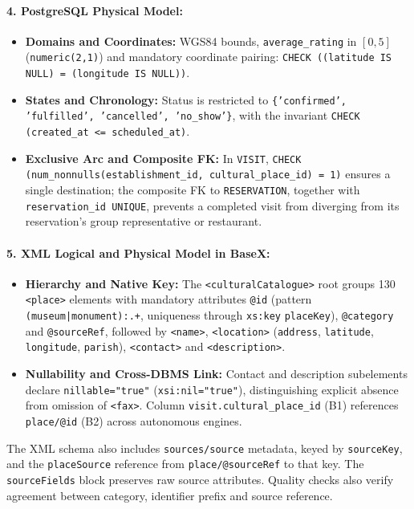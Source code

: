 \paragraph{4. PostgreSQL Physical Model:}
\begin{itemize}\raggedright
\item \textbf{Domains and Coordinates:} WGS84 bounds, \texttt{average\_\allowbreak{}rating} in $[0, 5]$ (\texttt{numeric(\allowbreak{}2,\allowbreak{}1)}) and mandatory coordinate pairing: \texttt{CHECK (\allowbreak{}(\allowbreak{}latitude IS NULL) = (\allowbreak{}longitude IS NULL))}.
\item \textbf{States and Chronology:} Status is restricted to \texttt{\{'confirmed',\allowbreak{} 'fulfilled',\allowbreak{} 'cancelled',\allowbreak{} 'no\_\allowbreak{}show'\}}, with the invariant \texttt{CHECK (\allowbreak{}created\_\allowbreak{}at <= scheduled\_\allowbreak{}at)}.
\item \textbf{Exclusive Arc and Composite FK:} In \texttt{VISIT}, \texttt{CHECK (\allowbreak{}num\_\allowbreak{}nonnulls(\allowbreak{}establishment\_\allowbreak{}id,\allowbreak{} cultural\_\allowbreak{}place\_\allowbreak{}id) = 1)} ensures a single destination; the composite FK to \texttt{RESERVATION}, together with \texttt{reservation\_\allowbreak{}id UNIQUE}, prevents a completed visit from diverging from its reservation's group representative or restaurant.
\end{itemize}
\paragraph{5. XML Logical and Physical Model in BaseX:}
\begin{itemize}\raggedright
\item \textbf{Hierarchy and Native Key:} The \texttt{<culturalCatalogue>} root groups 130 \texttt{<place>} elements with mandatory attributes \texttt{@id} (pattern \texttt{(\allowbreak{}museum|monument):.+}, uniqueness through \texttt{xs:key} \texttt{placeKey}), \texttt{@category} and \texttt{@sourceRef}, followed by \texttt{<name>}, \texttt{<location>} (\texttt{address}, \texttt{latitude}, \texttt{longitude}, \texttt{parish}), \texttt{<contact>} and \texttt{<description>}.
\item \textbf{Nullability and Cross-DBMS Link:} Contact and description subelements declare \texttt{nillable="true"} (\texttt{xsi:nil="true"}), distinguishing explicit absence from omission of \texttt{<fax>}. Column \texttt{visit.cultural\_\allowbreak{}place\_\allowbreak{}id} (B1) references \texttt{place/@id} (B2) across autonomous engines.
\end{itemize}
The XML schema also includes \texttt{sources/source} metadata, keyed by \texttt{sourceKey}, and the \texttt{placeSource} reference from \texttt{place/@sourceRef} to that key. The \texttt{sourceFields} block preserves raw source attributes. Quality checks also verify agreement between category, identifier prefix and source reference.

